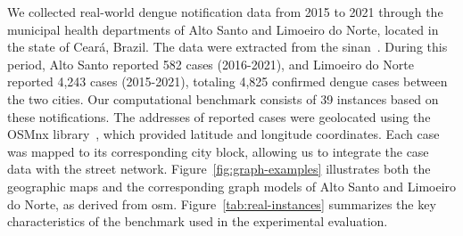 We collected real-world dengue notification data from 2015 to 2021 through the
municipal health departments of Alto Santo and Limoeiro do Norte, located in the
state of Ceará, Brazil. The data were extracted from the
\gls{sinan}~\cite{laguardia:2004}. During this period, Alto Santo reported 582
cases (2016-2021), and Limoeiro do Norte reported 4,243 cases (2015-2021),
totaling 4,825 confirmed dengue cases between the two cities. Our computational
benchmark consists of 39 instances based on these notifications. The addresses
of reported cases were geolocated using the OSMnx library~\cite{boeing:2017},
which provided latitude and longitude coordinates. Each case was mapped to its
corresponding city block, allowing us to integrate the case data with the street
network. Figure~\ref{fig:graph-examples} illustrates both the geographic maps and the
corresponding graph models of Alto Santo and Limoeiro do Norte, as derived from \gls{osm}. Figure~\ref{tab:real-instances} summarizes the key characteristics
of the benchmark used in the experimental evaluation.

